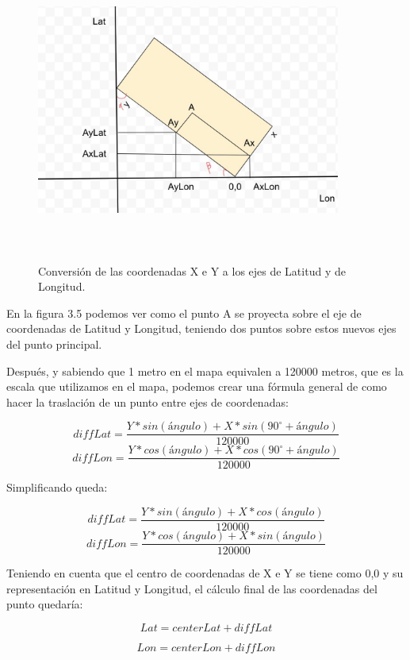 \begin{figure}[t]
    \centering
    \includegraphics[width=10cm,height=10cm,keepaspectratio]{img/traslation_coorinates.jpg}
    \caption{Conversión de las coordenadas X
e Y a los ejes de Latitud y de Longitud.}
    \label{fig:traslation_coordinates}
\end{figure}


En la figura 3.5 podemos ver como el punto A se proyecta sobre el eje de coordenadas de Latitud y Longitud, teniendo dos puntos sobre estos nuevos ejes del punto principal.


Después, y sabiendo que 1 metro en el mapa equivalen a 120000 metros, que es la escala que utilizamos en el mapa, podemos crear una fórmula general de como hacer la traslación de un punto entre ejes de coordenadas:


\[ diffLat = \frac{Y*sin(ángulo) + X*sin(90 ^{\circ}  + ángulo)}{120000} \]
\[ diffLon = \frac{Y*cos(ángulo) + X*cos(90^{\circ} + ángulo)}{120000} \]

Simplificando queda:



\[ diffLat = \frac{Y*sin(ángulo) + X*cos(ángulo)}{120000} \]
\[ diffLon = \frac{Y*cos(ángulo) + X*sin(ángulo)}{120000} \]

Teniendo en cuenta que el centro de coordenadas de X e Y se tiene como 0,0 y su representación en Latitud y Longitud, el cálculo final de las coordenadas del punto quedaría:

\[ Lat = centerLat + diffLat \]

\[ Lon = centerLon + diffLon  \]


